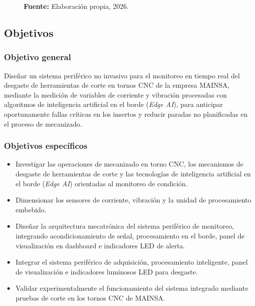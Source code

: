 \begin{figure}[!htb]
\par\vspace{0.2cm}
{\centering\textbf{Fuente:} Elaboración propia, 2026.\par}
\end{figure}

\subsection{Objetivos}
\label{subsec:objetivos}

\subsubsection{Objetivo general}
\label{subsubsec:objetivo_general}

Diseñar un sistema periférico no invasivo para el monitoreo en tiempo real del desgaste de herramientas de corte en tornos CNC de la empresa MAINSA, mediante la medición de variables de corriente y vibración procesadas con algoritmos de inteligencia artificial en el borde (\textit{Edge AI}), para anticipar oportunamente fallas críticas en los insertos y reducir paradas no planificadas en el proceso de mecanizado.

\subsubsection{Objetivos específicos}
\label{subsubsec:objetivos_especificos}

\begin{itemize}
\item Investigar las operaciones de mecanizado en torno CNC, los mecanismos de desgaste de herramientas de corte y las tecnologías de inteligencia artificial en el borde (\textit{Edge AI}) orientadas al monitoreo de condición.
\item Dimensionar los sensores de corriente, vibración y la unidad de procesamiento embebido.
\item Diseñar la arquitectura mecatrónica del sistema periférico de monitoreo, integrando acondicionamiento de señal, procesamiento en el borde, panel de visualización en dashboard e indicadores LED de alerta.
\item Integrar el sistema periférico de adquisición, procesamiento inteligente, panel de visualización e indicadores luminosos LED para desgaste.
\item Validar experimentalmente el funcionamiento del sistema integrado mediante pruebas de corte en los tornos CNC de MAINSA.
\end{itemize}

